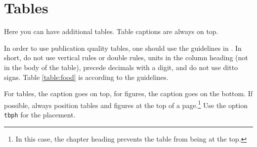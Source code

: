 \documentclass[msc,oneside]{ubcthesis}%
\begin{document}




%


\newpage %
\pagestyle{fancy}\rhead{}\cfoot{}\rfoot{\thepage}


%

\newpage
\pagestyle{headings}

\printindex


\appendix 
\addappheadtotoc %
\appendixpage 



\chapter{Tables}
Here you can have additional tables. Table captions are always on top.

In order to use publication quality tables, one should use the guidelines in \cite{Fear:2005manual}. In short, do not use vertical rules or double rules, units in the column heading (not in the body of the table), precede decimals with a digit, and do not use ditto signs. Table \ref{table:food} is according to the guidelines. 

For tables, the caption goes on top, for figures, the caption goes on the bottom. If possible, always position tables and figures at the top of a page.\footnote{In this case, the chapter heading prevents the table from being at the top.} Use the option \verb|tbph| for the placement.
\end{document}
